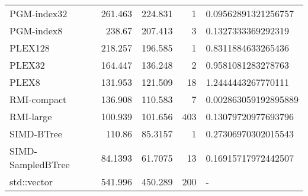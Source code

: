 \begin{tabular}{lrrrl}
 PGM-index32       &               261.463  &              224.831  &            1 & 0.09562891321256757  \\
 PGM-index8        &               238.67   &              207.413  &            3 & 0.1327333369292319   \\
 PLEX128           &               218.257  &              196.585  &            1 & 0.8311884633265436   \\
 PLEX32            &               164.447  &              136.248  &            2 & 0.9581081283278763   \\
 PLEX8             &               131.953  &              121.509  &           18 & 1.2444443267770111   \\
 RMI-compact       &               136.908  &              110.583  &            7 & 0.002863059192895889 \\
 RMI-large         &               100.939  &              101.656  &          403 & 0.13079720977693796  \\
 SIMD-BTree        &               110.86   &               85.3157 &            1 & 0.27306970302015543  \\
 SIMD-SampledBTree &                84.1393 &               61.7075 &           13 & 0.16915717972442507  \\
 std::vector       &               541.996  &              450.289  &          200 & -                    \\
\hline
\end{tabular}
